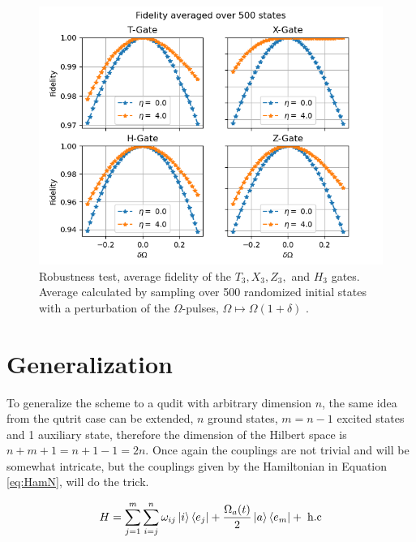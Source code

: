 \begin{figure}[H]
\includegraphics[scale=1]{figures/Fid500.png}

\caption{Robustness test, average fidelity of the $T_3,X_3,Z_3,$ and $H_3$ gates. Average calculated by sampling over 500 randomized initial states with a perturbation of the $\Omega$-pulses, $\Omega \mapsto \Omega(1+\delta)$ .}
\label{fig:fidelity}
\end{figure}

\section{Generalization}
To generalize the scheme to a qudit with arbitrary dimension $n$,  the same idea from the qutrit case can be extended, $n$ ground states, $m = n - 1$ excited states and 1 auxiliary state, therefore the dimension of the Hilbert space is  $n + m + 1 = n + 1 -1 = 2n$. Once again the couplings are not trivial and will be somewhat intricate, but the couplings given by the Hamiltonian in Equation \ref{eq:HamN}, will do the trick. 

\begin{equation}
H = \sum_{j = 1}^m \sum_{i = j}^n \omega_{ij} \ket{i}\bra{e_j} + \frac{\Omega_a(t)}{2}\ket{a}\bra{e_m} +\;\text{h.c}
\label{eq:HamN}
\end{equation}

